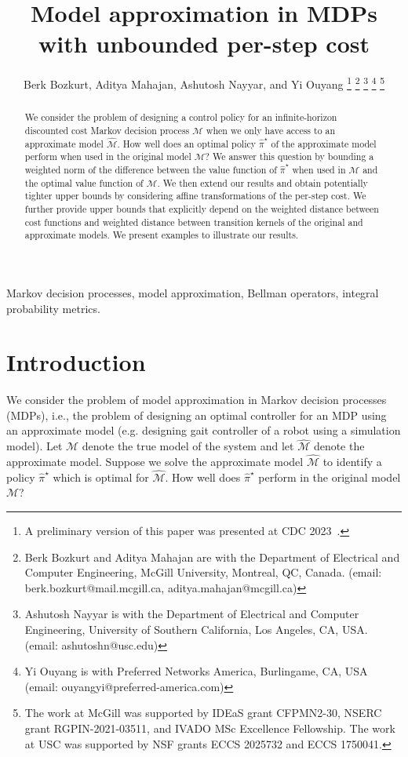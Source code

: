\documentclass[letterpaper, 10pt]{IEEEtran}
\newcommand*\ALPHABET{\mathcal}
\begin{document}
\title{Model approximation in MDPs with unbounded per-step cost}
\author{Berk Bozkurt, Aditya Mahajan, Ashutosh Nayyar, and Yi Ouyang%
\thanks{A preliminary version of this paper was presented at CDC 2023~\cite{Bozkurt2023}.}%
\thanks{Berk Bozkurt and Aditya Mahajan are with the Department of Electrical and Computer Engineering, McGill University, Montreal, QC, Canada. (email: berk.bozkurt@mail.mcgill.ca, aditya.mahajan@mcgill.ca)}%
\thanks{Ashutosh Nayyar is with the Department of Electrical and Computer Engineering, University of Southern California, Los Angeles, CA, USA. (email: ashutoshn@usc.edu)}%
\thanks{Yi Ouyang is with Preferred Networks America, Burlingame, CA, USA (email: ouyangyi@preferred-america.com)}%
\thanks{The work at McGill  was supported by IDEaS grant CFPMN2-30, NSERC grant RGPIN-2021-03511, and  IVADO MSc Excellence Fellowship. The work at USC was supported by NSF grants ECCS 2025732 and ECCS 1750041.}
}
\maketitle

\begin{abstract}
   We consider the problem of designing a control policy for an infinite-horizon discounted cost Markov decision process $\mathcal{M}$ when we only have access to an approximate model $\hat{\mathcal{M}}$. How well does an optimal policy $\hat{\pi}^{\star}$ of the approximate model perform when used in the original model $\mathcal{M}$? We answer this question by bounding a weighted norm of the difference between the value function of $\hat{\pi}^\star $ when used in $\mathcal{M}$ and the optimal value function of $\mathcal{M}$.  We then extend our results and obtain potentially tighter upper bounds by considering affine transformations of the per-step cost. We further provide upper bounds that explicitly depend on the weighted distance between cost functions and weighted distance between transition kernels of the original and approximate models. We present examples to illustrate our results.
\end{abstract}

\begin{IEEEkeywords}
   Markov decision processes, model approximation, Bellman operators, integral probability metrics.
\end{IEEEkeywords}

\section{Introduction}
We consider the problem of model approximation in Markov decision processes (MDPs), i.e., the problem of designing  an optimal controller for an MDP using an approximate model (e.g. designing gait controller of a robot using a simulation model).  Let $\ALPHABET M$ denote the true model of the system and let $\hat{\ALPHABET M}$ denote the approximate model. Suppose we solve the approximate model $\hat{\ALPHABET M}$ to identify a policy $\hat\pi^\star$ which is optimal for $\hat{\ALPHABET M}$. How well does $\hat\pi^\star$ perform in the original model $\ALPHABET M$?
\end{document}

